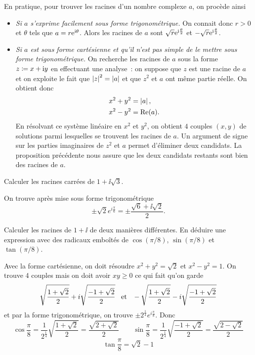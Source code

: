 \documentclass{magnolia}
\begin{document}
\begin{remarqueUnique}
\remarque En pratique, pour trouver les racines d'un nombre complexe $a$, on procède ainsi
  \begin{itemize}
    \item {\it Si $a$ s'exprime facilement sous forme trigonométrique.}
      On connait donc $r>0$ et $\theta$ tels que $a=r{\rm e}^{{\rm i}\theta}$. Alors
      les racines de $a$ sont $\sqrt{r}{\rm e}^{{\rm i}\frac{\theta}{2}}$
      et $-\sqrt{r}{\rm e}^{{\rm i}\frac{\theta}{2}}$.
    \item {\it Si $a$ est sous forme cartésienne et qu'il n'est pas
      simple de le mettre sous forme trigonométrique.}
      On recherche les racines de $a$ sous la forme $z\coloneqq x+{\rm i} y$ en
      effectuant une analyse~: on suppose que $z$ est une racine de $a$
      et on exploite le fait que $\left|z\right|^2=\left|a\right|$ et que $z^2$ et $a$
      ont même partie réelle. On obtient donc
      \begin{align*}
        x^2+y^2&=\left|a\right|,\\
        x^2-y^2&=\mathop{\rm Re}(a).
      \end{align*}
      En résolvant ce système linéaire en $x^2$ et $y^2$, on obtient $4$
      couples $(x,y)$ de solutions parmi lesquelles se trouvent les racines de 
      $a$. Un argument de signe sur les parties imaginaires de $z^2$ et
      $a$ permet d'éliminer deux candidats. La proposition précédente
      nous assure que les deux candidats restants sont bien des racines de
      $a$.
  \end{itemize}
\end{remarqueUnique}

\begin{exos}
\exo Calculer les racines carrées de $1+\ii\sqrt{3}$.
  \begin{sol}
  On trouve après mise sous forme trigonométrique
  \[\pm\sqrt{2}e^{i\frac{\pi}{6}}=\pm\frac{\sqrt{6}+\ii\sqrt{2}}{2}.\]
  \end{sol}
\exo Calculer les racines de $1+\ii$ de deux manières différentes.
  En déduire une expression avec des radicaux emboîtés de
  $\cos(\pi/8)$, $\sin(\pi/8)$ et $\tan(\pi/8)$.
  \begin{sol}
  Avec la forme cartésienne, on doit résoudre $x^2+y^2=\sqrt{2}$ et $x^2-y^2=1$. On trouve 4 couples mais on doit avoir $xy\geq 0$ ce qui fait qu'on garde 
  \[\sqrt{\frac{1+\sqrt{2}}{2}}+i\sqrt{\frac{-1+\sqrt{2}}{2}} \quad\!\text{et}\quad\!
    -\sqrt{\frac{1+\sqrt{2}}{2}}-i\sqrt{\frac{-1+\sqrt{2}}{2}}\]
  et par la forme trigonométrique, on trouve $\pm 2^{\frac{1}{4}}e^{i\frac{\pi}{8}}$. Donc
  \[\cos\frac{\pi}{8}=\frac{1}{2^{\frac{1}{4}}}\sqrt{\frac{1+\sqrt{2}}{2}}=
    \frac{\sqrt{2+\sqrt{2}}}{2} \qquad
    \sin\frac{\pi}{8}=\frac{1}{2^{\frac{1}{4}}}\sqrt{\frac{-1+\sqrt{2}}{2}}=
    \frac{\sqrt{2-\sqrt{2}}}{2}\]
  \[\tan\frac{\pi}{8}=\sqrt{2}-1\]
  \end{sol}
\end{exos}
\end{document}
